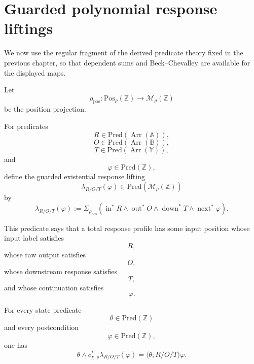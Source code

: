 \section{Guarded polynomial response liftings}
\label{sec:derived-poly-response-liftings}

We now use the regular fragment of the derived predicate theory fixed in the
previous chapter, so that dependent sums and Beck--Chevalley are available for
the displayed maps.

Let
\[
\rho_{\mathrm{pos}}:
\mathrm{Pos}_{\rho}(\mathbb Z)
\to
\mathcal M_\rho(\mathbb Z)
\]
be the position projection.

\begin{definition}
\label{def:derived-poly-guarded-existential-lifting}
For predicates
\[
R\in\mathrm{Pred}(\operatorname{Arr}(\mathbb A)),
\]
\[
O\in\mathrm{Pred}(\operatorname{Arr}(\mathbb B)),
\]
\[
T\in\mathrm{Pred}(\operatorname{Arr}(\mathbb Y)),
\]
and
\[
\varphi\in\mathrm{Pred}(\mathbb Z),
\]
define the guarded existential response lifting
\[
\lambda_{R/O/T}(\varphi)
\in
\mathrm{Pred}(\mathcal M_\rho(\mathbb Z))
\]
by
\[
\lambda_{R/O/T}(\varphi)
:=
\Sigma_{\rho_{\mathrm{pos}}}
\left(
\operatorname{in}^{\ast}R
\wedge
\operatorname{out}^{\ast}O
\wedge
\operatorname{down}^{\ast}T
\wedge
\operatorname{next}^{\ast}\varphi
\right).
\]
\end{definition}

This predicate says that a total response profile has some input position
whose input label satisfies
\[
R,
\]
whose raw output satisfies
\[
O,
\]
whose downstream response satisfies
\[
T,
\]
and whose continuation satisfies
\[
\varphi.
\]

\begin{theorem}
\label{thm:derived-poly-lifting-span-comparison}
For every state predicate
\[
\theta\in\mathrm{Pred}(\mathbb Z)
\]
and every postcondition
\[
\varphi\in\mathrm{Pred}(\mathbb Z),
\]
one has
\[
\theta
\wedge
c_{\chi,\rho}^{\ast}\lambda_{R/O/T}(\varphi)
=
\langle\theta;R/O/T\rangle\varphi.
\]
\end{theorem}

